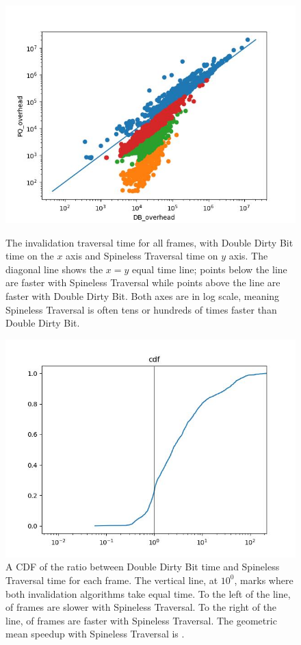 \begin{figure}
\begin{minipage}[t]{0.48\linewidth}
\includegraphics[width=\linewidth]{DBPQOverhead.jpg}
\caption{
The invalidation traversal time for all \NumFrames frames,
    with Double Dirty Bit time on the $x$ axis
    and Spineless Traversal time on $y$ axis.
The diagonal line shows the $x = y$ equal time line;
    points below the line are faster with Spineless Traversal
    while points above the line are faster with Double Dirty Bit.
Both axes are in log scale, meaning Spineless Traversal is often
    tens or hundreds of times faster than Double Dirty Bit.
}
\label{fig:xy}
\end{minipage}\hfill%
\begin{minipage}[t]{0.48\linewidth}
\includegraphics[width=\linewidth]{DBPQCDF.jpg}
\caption{
  A CDF of the ratio between
    Double Dirty Bit time and Spineless Traversal time
    for each frame.
  The vertical line, at $10^0$,
    marks where both invalidation algorithms take equal time.
  To the left of the line,
    \PctSlower of frames are slower with Spineless Traversal.
  To the right of the line,
    \PctFaster of frames are faster with Spineless Traversal.
  The geometric mean speedup with Spineless Traversal
    is \MeanSpeedup.}
\label{fig:cdf}
\end{minipage}
\end{figure}

